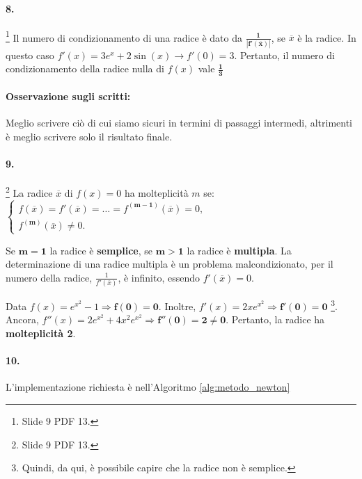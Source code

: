 \paragraph{8.}\footnote{Slide 9 PDF 13.} Il numero di condizionamento di una radice è dato da $\boldsymbol{\frac{1}{|f'(\overline{x})|}}$, se $\overline{x}$ è la radice. In questo caso $f'(x)=3e^x+2\sin{(x)}\rightarrow f'(0)=3$. Pertanto, il numero di condizionamento della radice nulla di $f(x)$ vale $\boldsymbol{\frac{1}{3}}$

\paragraph{Osservazione sugli scritti:} Meglio scrivere ciò di cui siamo sicuri in termini di passaggi intermedi, altrimenti è meglio scrivere solo il risultato finale.

\paragraph{9.}\footnote{Slide 9 PDF 13.} La radice $\overline{x}$ di $f(x)=0$ ha molteplicità $m$ se:
$\begin{cases}
	f(\overline{x})=f'(\overline{x})=\hdots=f^{(\boldsymbol{m-1})}(\overline{x})=0,\\
	f^{(\boldsymbol m)}(\overline{x})\neq 0.
\end{cases}$

\noindent Se $\boldsymbol{m=1}$ la radice è \textbf{semplice}, se $\boldsymbol{m>1}$ la radice è \textbf{multipla}. La determinazione di una radice multipla è un problema malcondizionato, per il numero della radice, $\frac{1}{f'(\overline{x})}$, è infinito, essendo $f'(\overline{x})=0$. 

\noindent Data $f(x)=e^{x^2}-1\Rightarrow\boldsymbol{f(0)=0}$. Inoltre, $f'(x)=2xe^{x^2}\Rightarrow\boldsymbol{f'(0)=0}$ \footnote{Quindi, da qui, è possibile capire che la radice non è semplice.}. Ancora, $f''(x)=2e^{x^2}+4x^2e^{x^2}\Rightarrow\boldsymbol{f''(0)=2\neq 0}.$ Pertanto, la radice ha \textbf{molteplicità 2}.

\paragraph{10.} L'implementazione richiesta è nell'Algoritmo \ref{alg:metodo_newton}

